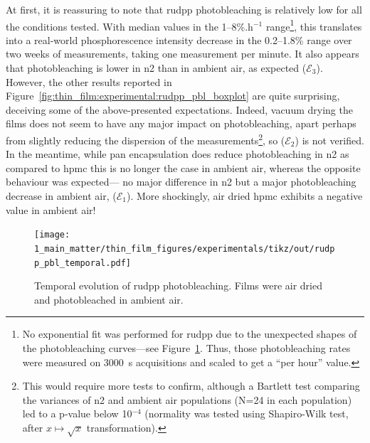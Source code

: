 At first, it is reassuring to note that \gls{rudpp} photobleaching is relatively low for all the conditions tested. With median values in the 1--8\%.h$^{-1}$ range\footnote{No exponential fit was performed for \gls{rudpp} due to the unexpected shapes of the photobleaching curves---see Figure~\ref{fig:thin_film:experimental:rudpp_pbl_temporal}. Thus, those photobleaching rates were measured on 3000~s acquisitions and scaled to get a \enquote{per hour} value.}, this translates into a real-world phosphorescence intensity decrease in the 0.2--1.8\% range over two weeks of measurements, taking one measurement per minute. It also appears that photobleaching is lower in \gls{n2} than in ambient air, as expected ($\mathcal{E}_3$). However, the other results reported in Figure~\ref{fig:thin_film:experimental:rudpp_pbl_boxplot} are quite surprising, deceiving some of the above-presented expectations. Indeed, vacuum drying the films does not seem to have any major impact on photobleaching, apart perhaps from slightly reducing the dispersion of the measurements\footnote{This would require more tests to confirm, although a Bartlett test comparing the variances of \gls{n2} and ambient air populations (N=24 in each population) led to a p-value below 10$^{-4}$ (normality was tested using Shapiro-Wilk test, after $x\mapsto \sqrt{x}$ transformation).}, so ($\mathcal{E}_2$) is not verified. In the meantime, while \gls{pan} encapsulation does reduce photobleaching in \gls{n2} as compared to \gls{hpmc} this is no longer the case in ambient air, whereas the opposite behaviour was expected---\ie{} no major difference in \gls{n2} but a major photobleaching decrease in ambient air, ($\mathcal{E}_1$). More shockingly, air dried \gls{hpmc} exhibits a negative value in ambient air!

\begin{figure}
	\centering
	\texttt{[image: 1\_main\_matter/thin\_film\_figures/experimentals/tikz/out/rudpp\_pbl\_temporal.pdf]}
	\caption[Temporal evolution of \gls{rudpp} photobleaching.]{Temporal evolution of \gls{rudpp} photobleaching. Films were air dried and photo\-bleached in ambient air.}
	\label{fig:thin_film:experimental:rudpp_pbl_temporal}
\end{figure}


